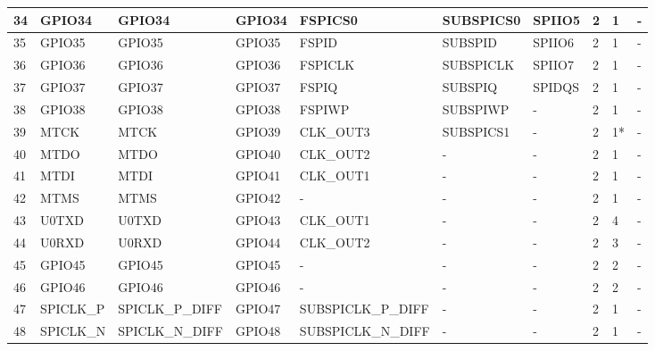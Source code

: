 \begin{longtable}[c]{|l|l|l|l|l|l|l|p{0.5cm}<{\centering}|p{0.5cm}<{\centering}|p{0.8cm}<{\centering}| }
34 & GPIO34          &  GPIO34       & GPIO34  & FSPICS0    & SUBSPICS0    & SPIIO5      & 2 & 1 & -    \\ \hline
35 & GPIO35          &  GPIO35       & GPIO35  & FSPID      & SUBSPID      & SPIIO6      & 2 & 1 & -    \\ \hline
36 & GPIO36          &  GPIO36       & GPIO36  & FSPICLK    & SUBSPICLK    & SPIIO7      & 2 & 1 & -    \\ \hline
37 & GPIO37          &  GPIO37       & GPIO37  & FSPIQ      & SUBSPIQ      & SPIDQS      & 2 & 1 & -    \\ \hline
38 & GPIO38          &  GPIO38       & GPIO38  & FSPIWP     & SUBSPIWP     & -           & 2 & 1 & -    \\ \hline
39 & MTCK            &  MTCK         & GPIO39  & CLK\_OUT3  & SUBSPICS1    & -           & 2 & 1* & -    \\ \hline
40 & MTDO            &  MTDO         & GPIO40  & CLK\_OUT2  & -            & -           & 2 & 1 & -    \\ \hline
41 & MTDI            &  MTDI         & GPIO41  & CLK\_OUT1  & -            & -           & 2 & 1 & -    \\ \hline
42 & MTMS            &  MTMS         & GPIO42  & -          & -            & -           & 2 & 1 & -    \\ \hline
43 & U0TXD           &  U0TXD        & GPIO43  & CLK\_OUT1  & -            & -           & 2 & 4 & -    \\ \hline
44 & U0RXD           &  U0RXD        & GPIO44  & CLK\_OUT2  & -            & -           & 2 & 3 & -    \\ \hline
45 & GPIO45          &  GPIO45       & GPIO45  & -          & -            & -           & 2 & 2 & -    \\ \hline
46 & GPIO46          &  GPIO46       & GPIO46  & -          & -            & -           & 2 & 2 & -    \\ \hline

47 & SPICLK\_P & SPICLK\_P\_DIFF & GPIO47 & \tiny{SUBSPICLK\_P\_DIFF} & - & - & 2 & 1 & - \\ \hline
48 & SPICLK\_N & SPICLK\_N\_DIFF & GPIO48 & \tiny{SUBSPICLK\_N\_DIFF} & - & - & 2 & 1 & - \\ \hline

    \end{longtable}
\normalsize
